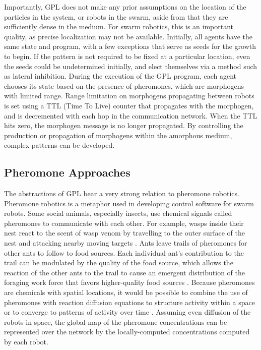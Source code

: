Importantly, GPL does not make any prior assumptions on the location of the particles in the system, or robots in the swarm, aside from that they are sufficiently dense in the medium. 
For swarm robotics, this is an important quality, as precise localization may not be available. 
Initially, all agents have the same state and program, with a few exceptions that serve as seeds for the growth to begin. 
If the pattern is not required to be fixed at a particular location, even the seeds could be undetermined initially, and elect themselves via a method such as lateral inhibition. 
During the execution of the GPL program, each agent chooses its state based on the presence of pheromones, which are morphogens with limited range. 
Range limitation on morphogens propagating between robots is set using a TTL (Time To Live) counter that propagates with the morphogen, and is decremented with each hop in the communication network. 
When the TTL hits zero, the morphogen message is no longer propagated. 
By controlling the production or propagation of morphogens within the amorphous medium, complex patterns can be developed. 

\subsection{Pheromone Approaches} \label{section:Pheromone_Approaches}

The abstractions of GPL bear a very strong relation to pheromone robotics. 
Pheromone robotics is a metaphor used in developing control software for swarm robots. 
Some social animals, especially insects, use chemical signals called pheromones to communicate with each other. 
For example, wasps inside their nest react to the scent of wasp venom by travelling to the outer surface of the nest and attacking nearby moving targets  \citep{jeanne1981alarm}.
Ants leave trails of pheromones for other ants to follow to food sources. 
Each individual ant's contribution to the trail can be modulated by the quality of the food source, which allows the reaction of the other ants to the trail to cause an emergent distribution of the foraging work force that favors higher-quality food sources \citep{sumpter2003nonlinearity}.
Because pheromones are chemicals with spatial locations, it would be possible to combine the use of pheromones with reaction diffusion equations to structure activity within a space or to converge to patterns of activity over time  \citep{turing1952chemical}. 
Assuming even diffusion of the robots in space, the global map of the pheromone concentrations can be represented over the network by the locally-computed concentrations computed by each robot.

